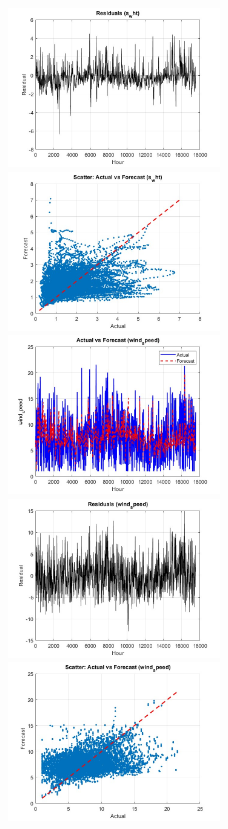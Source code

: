 \begin{figure}
    \centering
    \includegraphics[width=0.5\textwidth]{graphs/hybrid/120 hours/s_wht/residuals.jpg}\hfill
    \includegraphics[width=0.5\textwidth]{graphs/hybrid/120 hours/s_wht/scatter plot.jpg}\\[1ex]
    \includegraphics[width=0.5\textwidth]{graphs/hybrid/120 hours/wind speed/actual vs forecast.jpg}\hfill
    \includegraphics[width=0.5\textwidth]{graphs/hybrid/120 hours/wind speed/residuals.jpg}\\[1ex]
    \centering
    \includegraphics[width=0.5\textwidth]{graphs/hybrid/120 hours/wind speed/scatter plot.jpg}
    

\end{figure}
